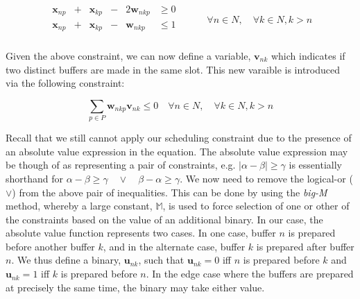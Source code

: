 \begin{equation}
    \begin{split}
        \begin{alignedat}{3}
            \boldsymbol{x}_{np} & {}+{} & \boldsymbol{x}_{kp} & {}-{} & 2 
            \boldsymbol{w}_{nkp} & \ge 0\\
            \boldsymbol{x}_{np} & {}+{} & \boldsymbol{x}_{kp} & {}-{} &
            \boldsymbol{w}_{nkp} & \le 1\\
        \end{alignedat}
    \end{split}
    \quad\quad
    \begin{split}
        \forall n \in N, \quad \forall k \in N, k > n
    \end{split}
\end{equation}

Given the above constraint, we can now define a variable, 
$ \boldsymbol{v}_{nk} $ which indicates if two distinct buffers are made in the
same slot.
This new varaible is introduced via the following constraint:

\begin{equation}
    \sum_{p \in P} \boldsymbol{w}_{nkp} \boldsymbol{v}_{nk} \le 0 \quad
    \forall n \in N, \quad \forall k \in N, k > n
\end{equation}

Recall that we still cannot apply our scheduling constraint due to the presence
of an absolute value expression in the equation.
The absolute value expression may be though of as representing a pair of 
constraints, e.g.
$ \lvert \alpha - \beta \rvert \ge \gamma $
is essentially shorthand for
$ \alpha - \beta \ge \gamma \quad \lor \quad \beta - \alpha \ge \gamma $. 
We now need to remove the logical-or ($\lor$) from the above pair of
inequalities.
This can be done by using the \emph{big-M} method, whereby a large constant,
$ \mathbb{M} $, is used to force selection of one or other of the constraints
based on the value of an additional binary.
In our case, the absolute value function represents two cases.
In one case, buffer $n$ is prepared before another buffer $k$, and in the
alternate case, buffer $k$ is prepared after buffer $n$.
We thus define a binary, $\boldsymbol{u}_{nk}$, such that
$ \boldsymbol{u}_{nk} = 0 $ iff $n$ is prepared before $k$ and
$ \boldsymbol{u}_{nk} = 1 $ iff $k$ is prepared before $n$.
In the edge case where the buffers are prepared at precisely the same time,
the binary may take either value.


